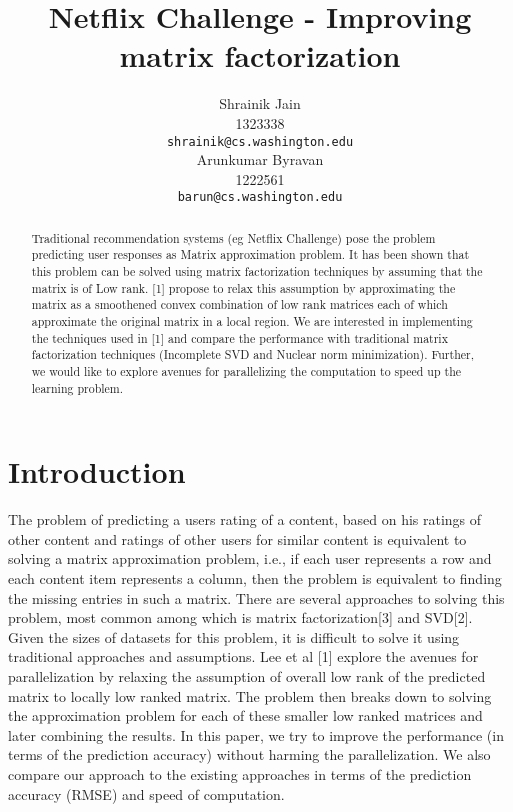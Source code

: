 \documentclass{article} %
\title{Netflix Challenge - Improving matrix factorization}
\author{
Shrainik Jain\\
1323338\\
\texttt{shrainik@cs.washington.edu} \\
\And
Arunkumar Byravan \\
1222561 \\
\texttt{barun@cs.washington.edu} \\
}
\begin{document}
\maketitle

\begin{abstract}
Traditional recommendation systems (eg Netflix Challenge) pose the problem predicting user responses as Matrix approximation problem. It has been shown that this problem can be solved using matrix factorization techniques by assuming that the matrix is of Low rank. [1] propose to relax this assumption by approximating the matrix as a smoothened convex combination of low rank matrices each of which approximate the original matrix in a local region. We are interested in implementing the techniques used in [1] and compare the performance with traditional matrix factorization techniques (Incomplete SVD and Nuclear norm minimization). Further, we would like to explore avenues for parallelizing the computation to speed up the learning problem.
\end{abstract}

\section{Introduction}
The problem of predicting a users rating of a content, based on his ratings of other content and ratings of other users for similar content is equivalent to solving a matrix approximation problem, i.e., if each user represents a row and each content item represents a column, then the problem is equivalent to finding the missing entries in such a matrix. There are several approaches to solving this problem, most common among which is matrix factorization[3] and SVD[2]. \\
Given the sizes of datasets for this problem, it is difficult to solve it using traditional approaches and assumptions. Lee et al [1] explore the avenues for parallelization by relaxing the assumption of overall low rank of the predicted matrix to locally low ranked matrix. The problem then breaks down to solving the approximation problem for each of these smaller low ranked matrices and later combining the results. In this paper, we try to improve the performance (in terms of the prediction accuracy) without harming the parallelization. We also compare our approach to the existing approaches in terms of the prediction accuracy (RMSE) and speed of computation.
\end{document}
